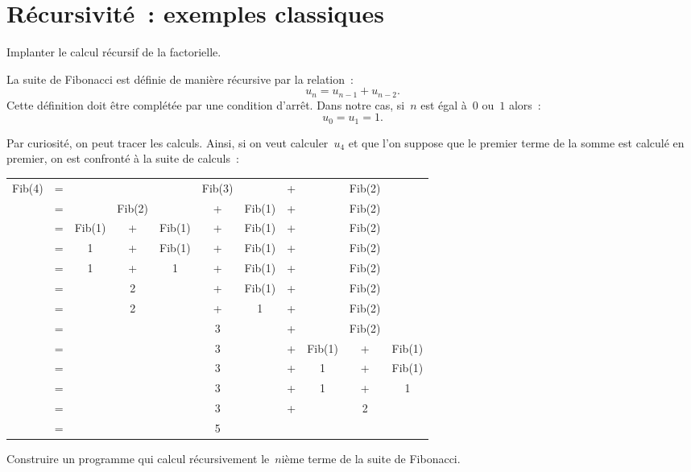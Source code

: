 \section{R\'ecursivit\'e~: exemples classiques}
\label{sec:Recursivite}
\begin{exercice}
  Implanter le calcul r\'ecursif de la factorielle.
  \ifcorrection
  \begin{correction}
    
  \end{correction}
  \fi
\end{exercice}
\begin{exercice}
  La suite de Fibonacci est d\'efinie de  mani\`ere r\'ecursive par la
  relation~:
  $$
  u_{n} = u_{n-1} + u_{n-2}.
  $$
  Cette d\'efinition doit \^etre compl\'et\'ee par une condition d'arr\^et.
  Dans notre cas, si~$n$ est \'egal \`a~$0$ ou~$1$ alors~:
  $$
  u_{0}=u_{1}=1.
  $$
  \par
  Par curiosit\'e, on   peut tracer les  calculs.   Ainsi, si on  veut
  calculer~$u_{4}$  et que  l'on suppose que   le premier terme  de la
  somme est calcul\'e en premier,  on est confront\'e  \`a la suite de
  calculs~:
  \par
  \begin{tabular}{c c c c c c c c ccc}
    Fib(4) &=& &&&Fib(3)& &+& &Fib(2) \\
    &=& &Fib(2)&&+&Fib(1) &+& &Fib(2) \\
    &=& Fib(1)&+&Fib(1)&+&Fib(1) &+& &Fib(2) \\
    &=& 1&+&Fib(1)&+&Fib(1) &+& &Fib(2) \\
    &=& 1&+&1&+&Fib(1) &+& &Fib(2) \\
    &=& &2&&+&Fib(1) &+& &Fib(2) \\
    &=& &2&&+&1 &+& &Fib(2) \\
    &=& &&&3& &+& &Fib(2) \\
    &=& &&&3&  &+& Fib(1)&+&Fib(1) \\
    &=& &&&3&  &+& 1&+&Fib(1) \\    
    &=& &&&3&  &+& 1&+&1 \\   
    &=& &&&3&  &+& &2\\
    &=& &&&5 
  \end{tabular}
  \par
  Construire un   programme qui  calcul  r\'ecursivement  le~$n$i\`eme
  terme de la suite de Fibonacci.
  \ifcorrection
\begin{correction}
  
\end{correction}
\fi

\end{exercice}
